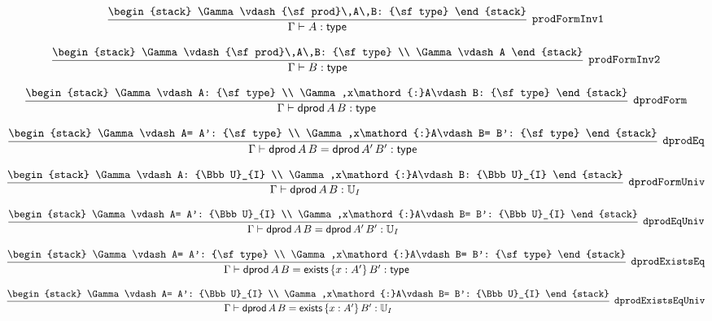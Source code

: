 \[
\infer[{\tt prodFormInv1}]{\Gamma \vdash A: {\sf type}}{
\begin{stack}
\Gamma \vdash {\sf prod}\,A\,B: {\sf type}
\end{stack}}
\]

\[
\infer[{\tt prodFormInv2}]{\Gamma \vdash B: {\sf type}}{
\begin{stack}
\Gamma \vdash {\sf prod}\,A\,B: {\sf type}
\\
\Gamma \vdash A
\end{stack}}
\]

\[
\infer[{\tt dprodForm}]{\Gamma \vdash {\sf dprod}\,A\,B: {\sf type}}{
\begin{stack}
\Gamma \vdash A: {\sf type}
\\
\Gamma ,x\mathord{:}A\vdash B: {\sf type}
\end{stack}}
\]

\[
\infer[{\tt dprodEq}]{\Gamma \vdash {\sf dprod}\,A\,B= {\sf dprod}\,A'\,B': {\sf type}}{
\begin{stack}
\Gamma \vdash A= A': {\sf type}
\\
\Gamma ,x\mathord{:}A\vdash B= B': {\sf type}
\end{stack}}
\]

\[
\infer[{\tt dprodFormUniv}]{\Gamma \vdash {\sf dprod}\,A\,B: {\Bbb U}_{I}}{
\begin{stack}
\Gamma \vdash A: {\Bbb U}_{I}
\\
\Gamma ,x\mathord{:}A\vdash B: {\Bbb U}_{I}
\end{stack}}
\]

\[
\infer[{\tt dprodEqUniv}]{\Gamma \vdash {\sf dprod}\,A\,B= {\sf dprod}\,A'\,B': {\Bbb U}_{I}}{
\begin{stack}
\Gamma \vdash A= A': {\Bbb U}_{I}
\\
\Gamma ,x\mathord{:}A\vdash B= B': {\Bbb U}_{I}
\end{stack}}
\]

\[
\infer[{\tt dprodExistsEq}]{\Gamma \vdash {\sf dprod}\,A\,B= {\sf exists}\,\{x : A'\}\,B': {\sf type}}{
\begin{stack}
\Gamma \vdash A= A': {\sf type}
\\
\Gamma ,x\mathord{:}A\vdash B= B': {\sf type}
\end{stack}}
\]

\[
\infer[{\tt dprodExistsEqUniv}]{\Gamma \vdash {\sf dprod}\,A\,B= {\sf exists}\,\{x : A'\}\,B': {\Bbb U}_{I}}{
\begin{stack}
\Gamma \vdash A= A': {\Bbb U}_{I}
\\
\Gamma ,x\mathord{:}A\vdash B= B': {\Bbb U}_{I}
\end{stack}}
\]


